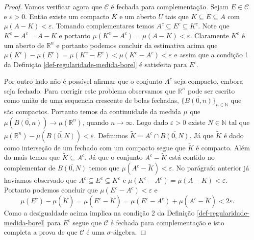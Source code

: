 \begin{proof}
Vamos verificar agora que $\mathscr{C}$ é fechada para 
complementação. Sejam $E\in\mathscr{C}$ e $\varepsilon>0$.
Então existe um compacto $K$ e um aberto $U$ tais que 
$K\subseteq E\subseteq A$ com $\mu(A-K)<\varepsilon$. Tomando 
complementares temos $A^c\subseteq E^c\subseteq K^c$.
Note que $K^c-A^c=A-K$ e portanto 
$\mu(K^c-A^c)=\mu(A-K)<\varepsilon$.
Claramente $K^c$ é um aberto de $\mathbb{R}^n$ e portanto
podemos concluir da estimativa acima que 
$\mu(K^c)-\mu(E^c)=\mu(K^c-E^c)<\mu(K^c-A^c)<\varepsilon$
e assim que a condição 1 da 
Definição \ref{def-regularidade-medida-borel}
é satisfeita para $E^c$.

Por outro lado não é possível afirmar que 
o conjunto $A^c$ seja compacto, embora 
seja fechado. Para corrigir este problema 
observamos que $\mathbb{R}^n$ pode ser escrito 
como união de uma sequencia crescente de bolas fechadas, 
$\{\overline{B(0,n)}\}_{n\in\mathbb{N}}$ que são compactos. 
Portanto temos da continuidade da medida $\mu$ que 
$\mu( \overline{B(0,n)} )\to \mu(\mathbb{R}^n)$, 
quando $n\to\infty$. Logo dado $\varepsilon >0$
existe $N\in\mathbb{N}$ tal que 
$\mu(\mathbb{R}^n)-\mu( \overline{B(0,N)} ) <\varepsilon$.
Definimos $\widetilde{K} =A^c\cap \overline{B(0,N)}$.
Já que  $\widetilde{K}$ é dado como interseção de um 
fechado com um compacto segue que $\widetilde{K}$ é 
compacto. Além do mais temos que 
$\widetilde{K}\subseteq A^c$.
Já que o conjunto $A^c-\widetilde{K}$ 
está contido no complementar de $\overline{B(0,N)}$
temos que $\mu(A^c-\widetilde{K})<\varepsilon$.
No parágrafo anterior já havíamos observado que 
$A^c\subseteq E^c\subseteq K^c$ e 
$\mu(K^c-A^c)=\mu(A-K)<\varepsilon$.
Portanto podemos concluir que $\mu(E^c-A^c)<\varepsilon$ e 
\[ 
\mu(E^c)-\mu(\widetilde{K})
=
\mu(E^c-\widetilde{K})
=
\mu(E^c-A^c)
+
\mu(A^c-\widetilde{K})
<
2\varepsilon.
\]
Como a desigualdade acima implica na condição 2 
da Definição \ref{def-regularidade-medida-borel}
para $E^c$ segue que $\mathscr{C}$ é fechada 
para complementação e isto completa a prova de 
que $\mathscr{C}$ é uma $\sigma$-álgebra.


\end{proof}
